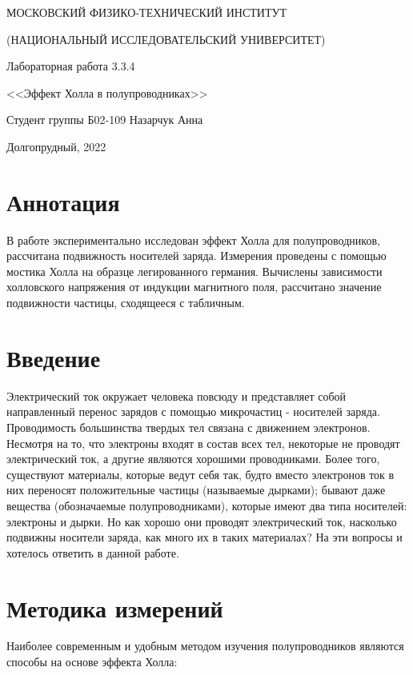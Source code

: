 \documentclass[a4paper,12pt]{article} %
\begin{document}
\begin{titlepage}

\thispagestyle{empty}

\centerline{МОСКОВСКИЙ ФИЗИКО-ТЕХНИЧЕСКИЙ ИНСТИТУТ}
\centerline{(НАЦИОНАЛЬНЫЙ ИССЛЕДОВАТЕЛЬСКИЙ УНИВЕРСИТЕТ)}

\vfill

\centerline{\huge{Лабораторная работа 3.3.4}}
\centerline{\LARGE{<<Эффект Холла в полупроводниках>>}}

\vfill

Студент группы Б02-109 \hfill Назарчук Анна

\vfill

\centerline{Долгопрудный, 2022}
\clearpage
\end{titlepage} 

\section{Аннотация}
В работе экспериментально исследован эффект Холла для полупроводников, рассчитана подвижность носителей заряда. Измерения проведены с помощью мостика Холла на образце легированного германия. Вычислены зависимости холловского напряжения от индукции магнитного поля, рассчитано значение подвижности частицы, сходящееся с табличным. 

\section{Введение}
Электрический ток окружает человека повсюду и представляет собой направленный перенос зарядов с помощью микрочастиц - носителей заряда. Проводимость большинства твердых тел связана с движением электронов. Несмотря на то, что электроны входят в состав всех тел, некоторые не проводят электрический ток, а другие являются хорошими проводниками. Более того, существуют материалы, которые ведут себя так, будто вместо электронов ток в них переносят положительные частицы (называемые дырками); бывают даже вещества (обозначаемые полупроводниками), которые имеют два типа носителей: электроны и дырки. Но как хорошо они проводят электрический ток, насколько подвижны носители заряда, как много их в таких материалах? На эти вопросы и хотелось ответить в данной работе.


\section{Методика измерений}
Наиболее современным и удобным методом изучения полупроводников являются способы на основе эффекта Холла:
\end{document}
